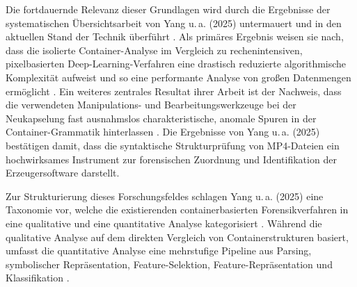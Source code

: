 Die fortdauernde Relevanz dieser Grundlagen wird durch die Ergebnisse der systematischen Übersichtsarbeit von Yang u.\,a. (2025) untermauert und in den aktuellen Stand der Technik überführt \cite{yang_comprehensive_2025}. Als primäres Ergebnis weisen sie nach, dass die isolierte Container-Analyse im Vergleich zu rechenintensiven, pixelbasierten Deep-Learning-Verfahren eine drastisch reduzierte algorithmische Komplexität aufweist und so eine performante Analyse von großen Datenmengen ermöglicht \cite[Kap. 4]{yang_comprehensive_2025}. Ein weiteres zentrales Resultat ihrer Arbeit ist der Nachweis, dass die verwendeten Manipulations- und Bearbeitungswerkzeuge bei der Neukapselung fast ausnahmslos charakteristische, anomale Spuren in der Container-Grammatik hinterlassen \cite[Kap. 5]{yang_comprehensive_2025}. Die Ergebnisse von Yang u.\,a. (2025) bestätigen damit, dass die syntaktische Strukturprüfung von MP4-Dateien ein hochwirksames Instrument zur forensischen Zuordnung und Identifikation der Erzeugersoftware darstellt.

Zur Strukturierung dieses Forschungsfeldes schlagen Yang u.\,a. (2025) eine Taxonomie vor, welche die existierenden containerbasierten Forensikverfahren in eine qualitative und eine quantitative Analyse kategorisiert \cite{yang_comprehensive_2025}. Während die qualitative Analyse auf dem direkten Vergleich von Containerstrukturen basiert, umfasst die quantitative Analyse eine mehrstufige Pipeline aus Parsing, symbolischer Repräsentation, Feature-Selektion, Feature-Repräsentation und Klassifikation \cite[Kap. 4]{yang_comprehensive_2025}.

